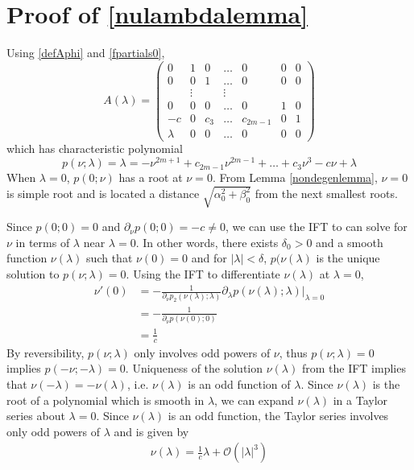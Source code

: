 \documentclass[thesis.tex]{subfiles}
\begin{document}
\section{Proof of \cref{nulambdalemma} }

Using \eqref{defAphi} and \eqref{fpartials0},
\begin{equation}\label{Alambdaform}
A(\lambda) = 
\begin{pmatrix}
0 & 1 & 0 & \dots & 0 & 0 & 0 \\
0 & 0 & 1 & \dots & 0 & 0 & 0\\
& \vdots && \vdots \\
0 & 0 & 0 & \dots & 0 & 1 & 0 \\
- c & 0 & c_3 & \dots & c_{2m-1} & 0 & 1 \\
\lambda & 0 & 0 & \dots & 0 & 0 & 0
\end{pmatrix}
\end{equation}
which has characteristic polynomial
\begin{equation}\label{charpolyA0lambda}
p(\nu; \lambda) = \lambda = -\nu^{2m+1} + c_{2m-1} \nu^{2m-1} + \dots + c_3 \nu^3 - c \nu + \lambda
\end{equation}
When $\lambda = 0$, $p(0; \nu)$ has a root at $\nu = 0$. From Lemma \ref{nondegenlemma}, $\nu = 0$ is simple root and is located a distance $\sqrt{\alpha_0^2 + \beta_0^2}$ from the next smallest roots. 

Since $p(0; 0) = 0$ and $\partial_\nu p(0; 0) = -c \neq 0$, we can use the IFT to can solve for $\nu$ in terms of $\lambda$ near $\lambda = 0$. In other words, there exists $\delta_0 > 0$ and a smooth function $\nu(\lambda)$ such that $\nu(0) = 0$ and for $|\lambda| < \delta$, $p(\nu(\lambda)$ is the unique solution to $p(\nu; \lambda) = 0$. Using the IFT to differentiate $\nu(\lambda)$ at $\lambda = 0$,
\begin{align*}
\nu'(0) &= -\frac{1}{\partial_\nu p_2(\nu(\lambda); \lambda) } \partial_\lambda p ( \nu(\lambda); \lambda ) \Big|_{\lambda = 0}\\
&= -\frac{1}{\partial_\nu p(\nu(0); 0) } \\
&= \frac{1}{c}
\end{align*}
By reversibility, $p(\nu; \lambda)$ only involves odd powers of $\nu$, thus $p(\nu; \lambda) = 0$ implies $p(-\nu; -\lambda) = 0$. Uniqueness of the solution $\nu(\lambda)$ from the IFT implies that $\nu(-\lambda) = -\nu(\lambda)$, i.e. $\nu(\lambda)$ is an odd function of $\lambda$. Since $\nu(\lambda)$ is the root of a polynomial which is smooth in $\lambda$, we can expand $\nu(\lambda)$ in a Taylor series about $\lambda = 0$. Since $\nu(\lambda)$ is an odd function, the Taylor series involves only odd powers of $\lambda$ and is given by
\begin{align*}
\nu(\lambda) = \frac{1}{c} \lambda + \mathcal{O}(|\lambda|^3)
\end{align*}
\end{document}
